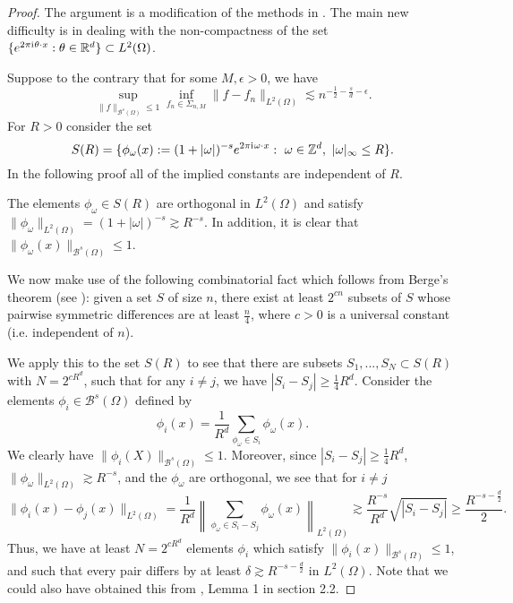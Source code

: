 \begin{proof}
 The argument is a modification of the methods in \cite{klusowski2018approximation,makovoz1996random}. The main new difficulty is in dealing with the non-compactness of the set $\{e^{2\pi{\mathrm{i}\mkern1mu} \theta\cdot x}:\theta\in \mathbb{R}^d\}\subset L^2(\Omega)$. 
 
 Suppose to the contrary that for some $M,\epsilon > 0$, we have
 \begin{equation}\label{eq_717}
  \sup_{\|f\|_{\mathcal{B}^s(\Omega)} \leq 1}\inf_{f_n\in\Sigma_{n,M}} \|f - f_n\|_{L^2(\Omega)} \lesssim n^{-\frac{1}{2} - \frac{s}{d} - \epsilon}.
 \end{equation}
 For $R > 0$ consider the set $$S(R) = \{\phi_\omega(x) := (1+|\omega|)^{-s}e^{2\pi {\mathrm{i}\mkern1mu} \omega\cdot x}:~\omega\in \mathbb{Z}^d,~|\omega|_\infty \leq R\}.$$
 In the following proof all of the implied constants are independent of $R$.
 
 The elements $\phi_\omega\in S(R)$ are orthogonal in $L^2(\Omega)$ and satisfy $\|\phi_\omega\|_{L^2(\Omega)} = (1+|\omega|)^{-s} \gtrsim R^{-s}$. In addition, it is clear that $\|\phi_\omega(x)\|_{\mathcal{B}^s(\Omega)} \leq 1$.
 
 We now make use of the following combinatorial fact which follows from Berge's theorem (see \cite{berge1973graphs,kainen1993quasiorthogonal}): given a set $S$ of size $n$, there exist at least $2^{cn}$ subsets of $S$ whose pairwise symmetric differences are at least $\frac{n}{4}$, where $c > 0$ is a universal constant (i.e. independent of $n$).
 
 We apply this to the set $S(R)$ to see that there are subsets $S_1,...,S_N\subset S(R)$ with $N = 2^{cR^d}$, such that for any $i\neq j$, we have $|S_i - S_j| \geq \frac{1}{4}R^d$. Consider the elements $\phi_i\in \mathcal{B}^s(\Omega)$ defined by
 \begin{equation}
  \phi_i(x) = \frac{1}{R^d} \sum_{\phi_\omega\in S_i}\phi_\omega(x).
 \end{equation}
 We clearly have $\|\phi_i(X)\|_{\mathcal{B}^s(\Omega)} \leq 1$. Moreover, since $|S_i - S_j| \geq \frac{1}{4}R^d$, $\|\phi_\omega\|_{L^2(\Omega)} \gtrsim R^{-s}$, and the $\phi_\omega$ are orthogonal, we see that for $i\neq j$
 \begin{equation}
 \|\phi_i(x) - \phi_j(x)\|_{L^2(\Omega)} = \frac{1}{R^d}\left\|\sum_{\phi_\omega\in S_i-S_j}\phi_\omega(x)\right\|_{L^2(\Omega)} \gtrsim \frac{R^{-s}}{R^d}\sqrt{|S_i-S_j|} \geq \frac{R^{-s-\frac{d}{2}}}{2}.
 \end{equation}
 Thus, we have at least $N = 2^{cR^d}$ elements $\phi_i$ which satisfy $\|\phi_i(x)\|_{\mathcal{B}^s(\Omega)} \leq 1$, and such that every pair differs by at least $\delta \gtrsim R^{-s-\frac{d}{2}}$ in $L^2(\Omega)$. Note that we could also have obtained this from \cite{klusowski2018approximation}, Lemma 1 in section 2.2.
 

\end{proof}
